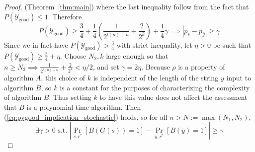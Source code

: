 \documentclass{article}
\def \Ygood{\mathcal{Y}_\text{good}}
\def \by{{\bar{y}}}
\theoremstyle{definition}
\newtheorem{lem}[thm]{Lemma}
\theoremstyle{remark}
\begin{document}
\begin{proof}{(Theorem~\ref{thm:main})}
where the last inequality follow from the fact that $P(\Ygood) \leq 1$.
Therefore
\begin{equation} \label{eq:pygood_implication_stochastic}
P(\Ygood) \geq \frac{3}{4} + \frac{1}{4}(\frac{1}{2^{l(n) - n}} + \frac{2}{2^k}) + \frac{1}{4} \gamma \implies |p_s - p_\by| \geq \gamma
\end{equation}
Since we in fact have $P(\Ygood) > \frac{3}{4}$ with strict inequality, let $\eta > 0$ be such that $P(\Ygood) \geq \frac{3}{4} + \eta$.
Choose $N_2, k$ large enough so that $n \geq N_2 \implies \frac{1}{2^{l(n) - n}} + \frac{2}{2^k} < \eta/2$, and set $\gamma = 2\eta$.
Because $\rho$ is a property of algorithm $A$, this choice of $k$ is independent of the length of the string $y$ input to algorithm $B$, so $k$ is a constant for the purposes of characterizing the complexity of algorithm $B$.
Thus setting $k$ to have this value does not affect the assessment that $B$ is a polynomial-time algorithm.
Then (\ref{eq:pygood_implication_stochastic}) holds, so for all $n > N := \max(N_1, N_2)$,
$$
\exists \gamma > 0 \text{ s.t. } |\Pr_{s, r^*}[B(G(s)) = 1] - \Pr_{\by, r^*}[B(\by) = 1]| \geq \gamma
$$

\end{proof}



\end{document}
